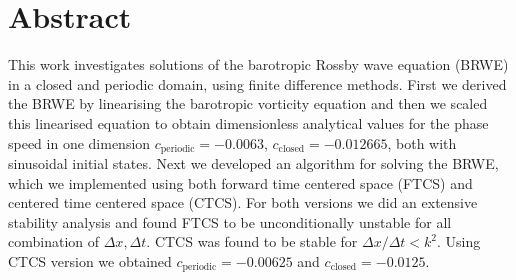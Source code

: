 \section*{Abstract}
This work investigates solutions of the barotropic Rossby wave equation (BRWE)
in a closed and periodic domain, using finite difference methods. First we
derived the BRWE  by linearising the barotropic vorticity equation and
then we scaled this linearised equation to obtain dimensionless analytical
values for the phase speed in one dimension $c_{\mathrm{periodic}} = -0.0063$,
$c_{\mathrm{closed}} = -0.012665$, both with sinusoidal initial states. 
Next we developed an algorithm for solving the BRWE, which we implemented using
both forward time centered space (FTCS) and centered time centered space (CTCS).
For both versions we did an extensive stability analysis and found FTCS to be
unconditionally unstable for all combination of $\Delta x, \Delta t$. CTCS was
found to be stable for $\Delta x / \Delta t < k^2$. Using CTCS version we
obtained $c_{\mathrm{periodic}}= - 0.00625$ and $c_{\mathrm{closed}} = -
0.0125$.  
